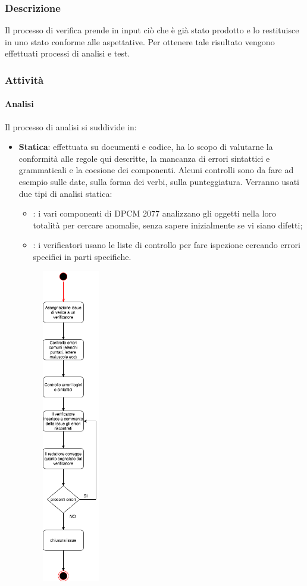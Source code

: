     	\subsubsection{Descrizione}
		Il processo di verifica prende in input ciò che è già stato prodotto e lo restituisce in uno stato conforme alle aspettative. Per ottenere tale risultato vengono effettuati processi di analisi e test.
		\subsubsection{Attività}
			\paragraph{Analisi}
			Il processo di analisi si suddivide in:
			\begin{itemize}
			\item \textbf{Statica}: effettuata su documenti e codice, ha lo scopo di valutarne la conformità alle regole qui descritte, la mancanza di errori sintattici e grammaticali e la coesione dei componenti. Alcuni controlli sono da fare ad esempio sulle date, sulla forma dei verbi, sulla punteggiatura. Verranno usati due tipi di analisi statica:
			\begin{itemize}
				\item \textbf{}: i vari componenti di DPCM 2077 analizzano gli oggetti nella loro totalità per cercare anomalie, senza sapere inizialmente se vi siano difetti;
				\item \textbf{}: i verificatori usano le liste di controllo per fare ispezione cercando errori specifici in parti specifiche.
			\end{itemize}
			\begin{figure}[H]
	\centering
	\includegraphics[width=2.5cm]{res/images/verifica.png}

\end{figure}
\end{itemize}
